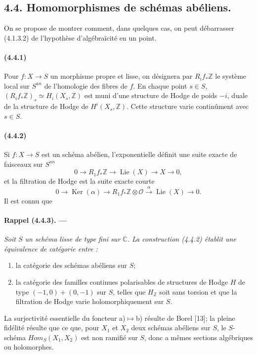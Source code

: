 \documentclass[10pt]{article}
\newcommand{\C}{\mathbb C}
\newcommand{\Z}{\mathbb Z}
\newcommand{\Ker}{\operatorname{Ker}}
\providecommand{\Lie}{\operatorname{Lie}}
\providecommand{\cO}{\mathcal O}
\providecommand{\cO}{\mathcal O}
\begin{document}
\subsection*{4.4. Homomorphismes de schémas abéliens.}

On se propose de montrer comment, dans quelques cas, on peut débarrasser (4.1.3.2) de l'hypothèse d'algébraïcité en un point.

\paragraph{(4.4.1)} Pour $f:X\to S$ un morphisme propre et lisse, on désignera par $R_if_*\Z$ le système local sur $S^{an}$ de l'homologie des fibres de $f$. En chaque point $s\in S$, $(R_if_*\Z)_s\simeq H_i(X_s,\Z)$ est muni d'une structure de Hodge de poids $-i$, duale de la structure de Hodge de $H^i(X_s,\Z)$. Cette structure varie continûment avec $s\in S$.

\paragraph{(4.4.2)} Si $f:X\to S$ est un schéma abélien, l'exponentielle définit une suite exacte de faisceaux sur $S^{an}$
\[
0\to R_1f_*\Z\to\Lie(X)\to X\to0,
\]
et la filtration de Hodge est la suite exacte courte
\[
0\to\Ker(\alpha)\to R_1f_*\Z\otimes\cO\xrightarrow{\alpha}\Lie(X)\to0.
\]
Il est connu que

\paragraph{Rappel (4.4.3). ---} {\itshape Soit $S$ un schéma lisse de type fini sur $\C$. La construction (4.4.2) établit une équivalence de catégorie entre :
\begin{enumerate}[label=\alph*)]
\item la catégorie des schémas abéliens sur $S$;
\item la catégorie des familles continues polarisables de structures de Hodge $H$ de type $(-1,0)+(0,-1)$ sur $S$, telles que $H_\Z$ soit sans torsion et que la filtration de Hodge varie holomorphiquement sur $S$.
\end{enumerate}}
La surjectivité essentielle du foncteur a)$\mapsto$b) résulte de Borel [13]; la pleine fidélité résulte que ce que, pour $X_1$ et $X_2$ deux schémas abéliens sur $S$, le $S$-schéma $\mathit{Hom}_S(X_1,X_2)$ est non ramifié sur $S$, donc a mêmes sections algébriques ou holomorphes.
\end{document}

